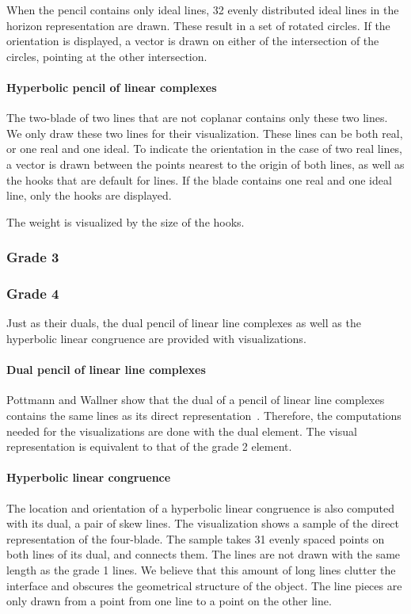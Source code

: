 When the pencil contains only ideal lines, 32 evenly distributed ideal lines in the horizon representation are drawn.  These result in a set of rotated circles.  If the orientation is displayed, a vector is drawn on either of the intersection of the circles, pointing at the other intersection.

\paragraph{Hyperbolic pencil of linear complexes}
The two-blade of two lines that are not coplanar contains only these two lines.  We only draw these two lines for their visualization.  These lines can be both real, or one real and one ideal.  To indicate the orientation in the case of two real lines, a vector is drawn between the points nearest to the origin of both lines, as well as the hooks that are default for lines.  If the blade contains one real and one ideal line, only the hooks are displayed.  

The weight is visualized by the size of the hooks.


\subsubsection{Grade 3}



\subsubsection{Grade 4}
Just as their duals, the dual pencil of linear line complexes as well as the hyperbolic linear congruence are provided with visualizations.

\paragraph{Dual pencil of linear line complexes}
Pottmann and Wallner show that the dual of a pencil of linear line complexes contains the same lines as its direct representation~\cite[Section 3.2.1]{Pottmann}.  Therefore, the computations needed for the visualizations are done with the dual element.  The visual representation is equivalent to that of the grade 2 element.

\paragraph{Hyperbolic linear congruence}
The location and orientation of a hyperbolic linear congruence is also computed with its dual, a pair of skew lines.  The visualization shows a sample of the direct representation of the four-blade.  The sample takes 31 evenly spaced points on both lines of its dual, and connects them.  The lines are not drawn with the same length as the grade 1 lines.  We believe that this amount of long lines clutter the interface and obscures the geometrical structure of the object.  The line pieces are only drawn from a point from one line to a point on the other line.

